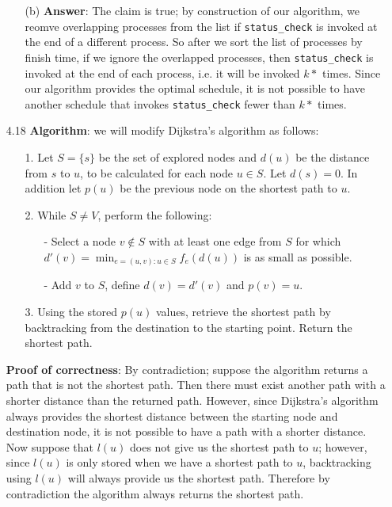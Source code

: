 \documentclass{article}
\begin{document}
\begin{itemize}
\begin{itemize}
                  \item [(b)] \textbf{Answer}: The claim is true; by construction of our algorithm, we reomve overlapping processes from the list if \texttt{status\_check} is invoked at the end of a different process. So after we sort the list of processes by finish time, if we ignore the overlapped processes, then \texttt{status\_check} is invoked at the end of each process, i.e. it will be invoked $k*$ times. Since our algorithm provides the optimal schedule, it is not possible to have another schedule that invokes \texttt{status\_check} fewer than $k*$ times.
            \end{itemize}
      \item [4.18]
            \textbf{Algorithm}: we will modify Dijkstra's algorithm as follows:
            \begin{itemize}
                  \item [1.] Let $S=\{s\}$ be the set of explored nodes and $d(u)$ be the distance from $s$ to $u$, to be calculated for each node $u\in S$. Let $d(s)=0$. In addition let $p(u)$ be the previous node on the shortest path to $u$.
                  \item [2.] While $S\neq V$, perform the following:
                        \begin{itemize}
                              \item [-] Select a node $v\notin S$ with at least one edge from $S$ for which $d'(v)=\min_{e=(u,v):u\in S}f_e(d(u))$ is as small as possible.
                              \item [-] Add $v$ to $S$, define $d(v)=d'(v)$ and $p(v)=u$.
                        \end{itemize}
                  \item [3.] Using the stored $p(u)$ values, retrieve the shortest path by backtracking from the destination to the starting point. Return the shortest path.
            \end{itemize}
            \textbf{Proof of correctness}: By contradiction; suppose the algorithm returns a path that is not the shortest path. Then there must exist another path with a shorter distance than the returned path. However, since Dijkstra's algorithm always provides the shortest distance between the starting node and destination node, it is not possible to have a path with a shorter distance. Now suppose that $l(u)$ does not give us the shortest path to $u$; however, since $l(u)$ is only stored when we have a shortest path to $u$, backtracking using $l(u)$ will always provide us the shortest path. Therefore by contradiction the algorithm always returns the shortest path.\\

\end{itemize}
\end{document}

